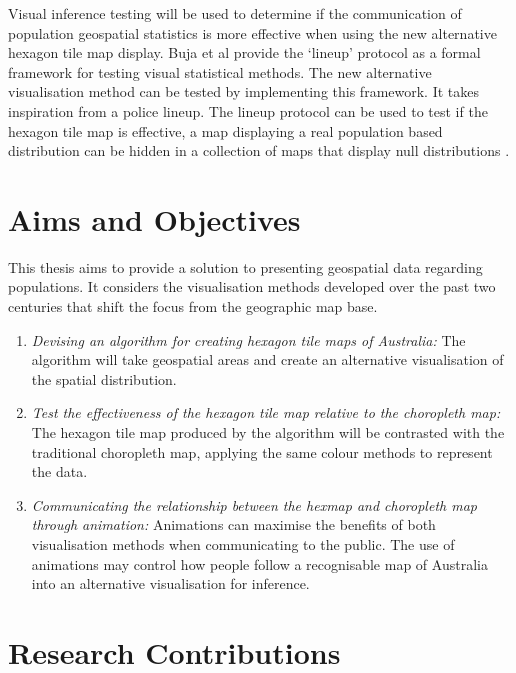 \documentclass{monashthesis}
\begin{document}
Visual inference testing will be used to determine if the communication of population geospatial statistics is more effective when using the new alternative hexagon tile map display.
Buja et al \autocite{GIIV} provide the `lineup' protocol as a formal framework for testing visual statistical methods. The new alternative visualisation method can be tested by implementing this framework.
It takes inspiration from a police lineup.
The lineup protocol can be used to test if the hexagon tile map is effective, a map displaying a real population based distribution can be hidden in a collection of maps that display null distributions \autocite{chowd}.

\hypertarget{sec:aims}{%
\section{Aims and Objectives}\label{sec:aims}}

This thesis aims to provide a solution to presenting geospatial data regarding populations.
It considers the visualisation methods developed over the past two centuries that shift the focus from the geographic map base.

\begin{enumerate}
\def\labelenumi{\arabic{enumi}.}
\item
  \emph{Devising an algorithm for creating hexagon tile maps of Australia:} The algorithm will take geospatial areas and create an alternative visualisation of the spatial distribution.
\item
  \emph{Test the effectiveness of the hexagon tile map relative to the choropleth map:} The hexagon tile map produced by the algorithm will be contrasted with the traditional choropleth map, applying the same colour methods to represent the data.
\item
  \emph{Communicating the relationship between the hexmap and choropleth map through animation:} Animations can maximise the benefits of both visualisation methods when communicating to the public. The use of animations may control how people follow a recognisable map of Australia into an alternative visualisation for inference.
\end{enumerate}

\hypertarget{research-contributions}{%
\section{Research Contributions}\label{research-contributions}}
\end{document}
